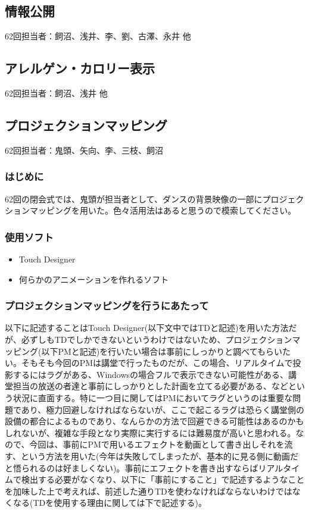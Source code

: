 \documentclass[dvipdfmx,jb5]{jarticle}
\begin{document}
 \subsection{情報公開}
62回担当者：飼沼、浅井、李、劉、古澤、永井 他

\subsection{アレルゲン・カロリー表示}\label{sec:アレルゲン・カロリー表示}
62回担当者：飼沼、浅井 他

\subsection{プロジェクションマッピング}
62回担当者：鬼頭、矢向、李、三枝、飼沼
\subsubsection{はじめに}
62回の閉会式では、鬼頭が担当者として、ダンスの背景映像の一部にプロジェクションマッピングを用いた。色々活用法はあると思うので模索してください。

\subsubsection{使用ソフト}
\begin{itemize}
  \item Touch Designer
  \item 何らかのアニメーションを作れるソフト
\end{itemize}
\subsubsection{プロジェクションマッピングを行うにあたって}
以下に記述することはTouch Designer(以下文中ではTDと記述)を用いた方法だが、必ずしもTDでしかできないというわけではないため、プロジェクションマッピング(以下PMと記述)を行いたい場合は事前にしっかりと調べてもらいたい。そもそも今回のPMは講堂で行ったものだが、この場合、リアルタイムで投影するにはラグがある、Windowsの場合フルで表示できない可能性がある、講堂担当の放送の者達と事前にしっかりとした計画を立てる必要がある、などという状況に直面する。特に一つ目に関してはPMにおいてラグというのは重要な問題であり、極力回避しなければならないが、ここで起こるラグは恐らく講堂側の設備の都合によるものであり、なんらかの方法で回避できる可能性はあるのかもしれないが、複雑な手段となり実際に実行するには難易度が高いと思われる。なので、今回は、事前にPMで用いるエフェクトを動画として書き出しそれを流す、という方法を用いた(今年は失敗してしまったが、基本的に見る側に動画だと悟られるのは好ましくない)。事前にエフェクトを書き出すならばリアルタイムで検出する必要がなくなり、以下に「事前にすること」で記述するようなことを加味した上で考えれば、前述した通りTDを使わなければならないわけではなくなる(TDを使用する理由に関しては下で記述する)。
\end{document}
